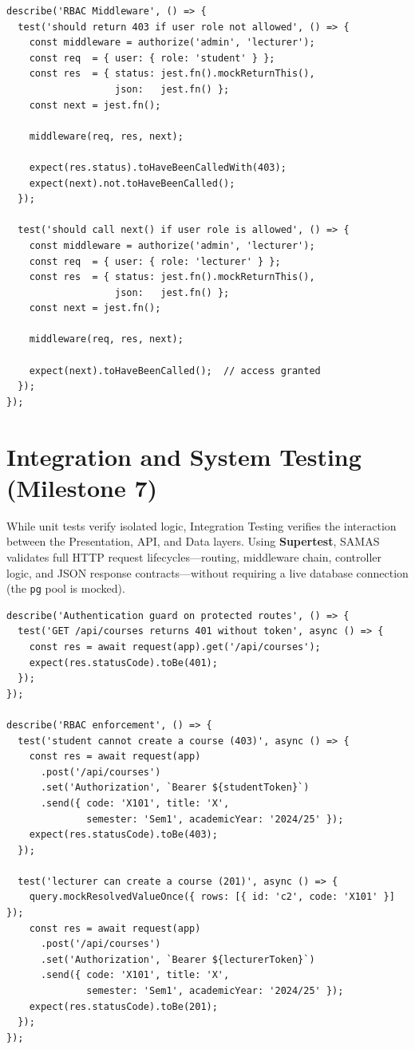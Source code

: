 \documentclass[12pt, a4paper]{report}
\begin{document}
\begin{lstlisting}[style=js_style, caption={TDD unit test for RBAC middleware (Jest) -- \texttt{tests/unit/rbac.test.js}}]
describe('RBAC Middleware', () => {
  test('should return 403 if user role not allowed', () => {
    const middleware = authorize('admin', 'lecturer');
    const req  = { user: { role: 'student' } };
    const res  = { status: jest.fn().mockReturnThis(),
                   json:   jest.fn() };
    const next = jest.fn();

    middleware(req, res, next);

    expect(res.status).toHaveBeenCalledWith(403);
    expect(next).not.toHaveBeenCalled();
  });

  test('should call next() if user role is allowed', () => {
    const middleware = authorize('admin', 'lecturer');
    const req  = { user: { role: 'lecturer' } };
    const res  = { status: jest.fn().mockReturnThis(),
                   json:   jest.fn() };
    const next = jest.fn();

    middleware(req, res, next);

    expect(next).toHaveBeenCalled();  // access granted
  });
});
\end{lstlisting}

\section{Integration and System Testing (Milestone 7)}
While unit tests verify isolated logic, Integration Testing verifies the interaction between the Presentation, API, and Data layers. Using \textbf{Supertest}, SAMAS validates full HTTP request lifecycles---routing, middleware chain, controller logic, and JSON response contracts---without requiring a live database connection (the \texttt{pg} pool is mocked).

\begin{lstlisting}[style=js_style, caption={Supertest integration test: RBAC and authentication guard (\texttt{tests/integration/api.test.js})}]
describe('Authentication guard on protected routes', () => {
  test('GET /api/courses returns 401 without token', async () => {
    const res = await request(app).get('/api/courses');
    expect(res.statusCode).toBe(401);
  });
});

describe('RBAC enforcement', () => {
  test('student cannot create a course (403)', async () => {
    const res = await request(app)
      .post('/api/courses')
      .set('Authorization', `Bearer ${studentToken}`)
      .send({ code: 'X101', title: 'X',
              semester: 'Sem1', academicYear: '2024/25' });
    expect(res.statusCode).toBe(403);
  });

  test('lecturer can create a course (201)', async () => {
    query.mockResolvedValueOnce({ rows: [{ id: 'c2', code: 'X101' }] });
    const res = await request(app)
      .post('/api/courses')
      .set('Authorization', `Bearer ${lecturerToken}`)
      .send({ code: 'X101', title: 'X',
              semester: 'Sem1', academicYear: '2024/25' });
    expect(res.statusCode).toBe(201);
  });
});
\end{lstlisting}
\end{document}
